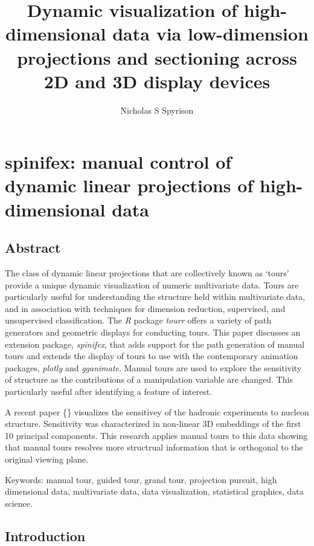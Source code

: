 \documentclass{monashthesis}
\author{Nicholas S Spyrison}
\title{Dynamic visualization of high-dimensional data via low-dimension
projections and sectioning across 2D and 3D display devices}
\theoremstyle{definition}
\theoremstyle{definition}
\theoremstyle{definition}
\theoremstyle{remark}
\begin{document}

\titlepage

{\sf\tighttoc\doublespacing}

\chapter{spinifex: manual control of dynamic linear projections of
high-dimensional
data}\label{spinifex-manual-control-of-dynamic-linear-projections-of-high-dimensional-data}

\section{Abstract}\label{abstract}

The class of dynamic linear projections that are collectively known as
`tours' provide a unique dynamic visualization of numeric multivariate
data. Tours are particularly useful for understanding the structure held
within multivariate data, and in association with techniques for
dimension reduction, supervised, and unsupervised classification. The
\emph{R} package \emph{tourr} offers a variety of path generators and
geometric displays for conducting tours. This paper discusses an
extension package, \emph{spinifex}, that adds support for the path
generation of manual tours and extends the display of tours to use with
the contemporary animation packages, \emph{plotly} and \emph{gganimate}.
Manual tours are used to explore the sensitivity of structure as the
contributions of a manipulation variable are changed. This particularly
useful after identifying a feature of interest.

A recent paper \{\textcite{wang_mapping_2018}\} visualizes the
sensitivey of the hadronic experiments to nucleon structure. Sensitivity
was characterized in non-linear 3D embeddings of the first 10 principal
components. This research applies manual tours to this data showing that
manual tours resolves more structrual information that is orthogonal to
the original viewing plane.

Keywords: manual tour, guided tour, grand tour, projection pursuit, high
dimensional data, multivariate data, data visualization, statistical
graphics, data science.

\section{Introduction}\label{introduction}
\end{document}
